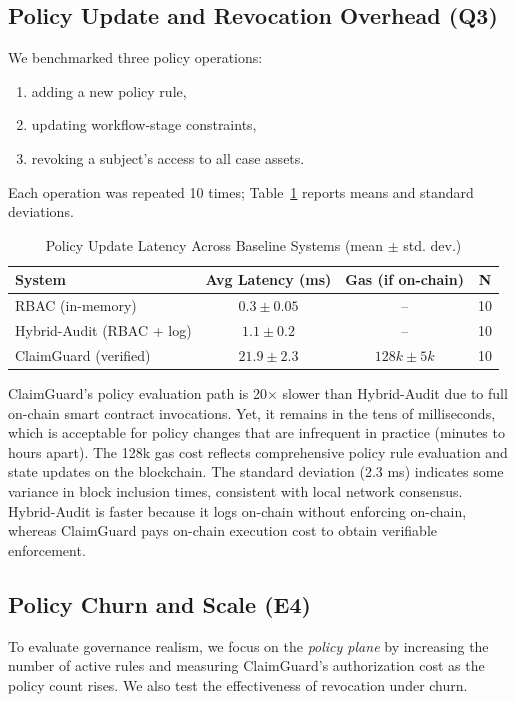 \documentclass[final,5p,times,twocolumn]{elsarticle}
\begin{document}
\subsection{Policy Update and Revocation Overhead (Q3)}
We benchmarked three policy operations:
\begin{enumerate}
	\item adding a new policy rule,
	\item updating workflow-stage constraints,
	\item revoking a subject's access to all case assets.
\end{enumerate}
Each operation was repeated 10 times; Table~\ref{tab:policy} reports means
and standard deviations.
\begin{table}[!htbp]
	\centering
	\caption{Policy Update Latency Across Baseline Systems (mean $\pm$ std. dev.)}
	\begin{tabularx}{\columnwidth}{>{\raggedright\arraybackslash}X c c c}
		\toprule
		\textbf{System}           & \textbf{Avg Latency (ms)} & \textbf{Gas (if on-chain)} & \textbf{N} \\
		\midrule
		RBAC (in-memory)          & $0.3 \pm 0.05$            & --                         & 10         \\
		Hybrid-Audit (RBAC + log) & $1.1 \pm 0.2$             & --                         & 10         \\
		ClaimGuard (verified)     & $21.9 \pm 2.3$            & $128k \pm 5k$              & 10         \\
		\bottomrule
	\end{tabularx}
	\label{tab:policy}
\end{table}
ClaimGuard's policy evaluation path is 20$\times$ slower than Hybrid-Audit due to full on-chain smart contract invocations. Yet, it remains in the tens of milliseconds, which is acceptable for policy changes that are infrequent in practice (minutes to hours apart). The 128k gas cost reflects comprehensive policy rule evaluation and state updates on the blockchain. The standard deviation (2.3 ms) indicates some variance in block inclusion times, consistent with local network consensus. Hybrid-Audit is faster because it logs on-chain without enforcing on-chain, whereas ClaimGuard pays on-chain execution cost to obtain verifiable enforcement.

\subsection{Policy Churn and Scale (E4)}
To evaluate governance realism, we focus on the \emph{policy plane} by increasing the number of active rules and measuring ClaimGuard's authorization cost as the policy count rises. We also test the effectiveness of revocation under churn.
\end{document}

